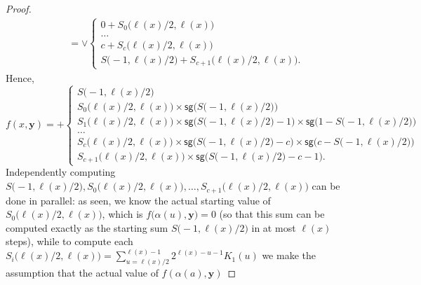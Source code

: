 \documentclass[11pt, oneside]{article}
\newenvironment{toappendix}{}{}
\newcommand{\fun}[1]{\mathsf{#1}}
\newcommand{\tu}[1]{\mathbf{#1}}
\theoremstyle{definition}
\begin{document}
\begin{toappendix}
\begin{proof}
\begin{align*}
        &= \vee \begin{cases}
            0 + S_0\big(\ell(x)/2, \ell(x)\big) \\
            \dots \\
            c + S_c\big(\ell(x)/2, \ell(x)\big) \\
            S\big(-1, \ell(x)/2\big) + S_{c+1}\big(\ell(x)/2, \ell(x)\big).
        \end{cases}
    \end{align*}
    Hence,
    $$
    f(x, \tu y) = + \begin{cases}
        S\big(-1, \ell(x)/2\big) \\
        S_0\big(\ell(x)/2, \ell(x)\big) \times \fun{sg}\big(S\big(-1, \ell(x)/2\big)\big) \\
        S_1\big(\ell(x)/2, \ell(x)\big) \times \fun{sg}\big(S\big(-1, \ell(x)/2\big)-1\big) \times \fun{sg}\big(1-S\big(-1, \ell(x)/2\big)\big) \\
        \dots \\
        S_c \big(\ell(x)/2, \ell(x)\big) \times \fun{sg}\big(S\big(-1, \ell(x)/2\big)-c\big) \times \fun{sg}\big(c-S\big(-1, \ell(x)/2\big)\big) \\
        S_{c+1} \big(\ell(x)/2, \ell(x)\big) \times \fun{sg}\big(S\big(-1, \ell(x)/2\big)-c-1\big).
    \end{cases}
    $$
    Independently computing $S\big(-1, \ell(x)/2\big), S_0\big(\ell(x)/2, \ell(x)\big), \dots, S_{c+1}\big(\ell(x)/2, \ell(x)\big)$ can be done in parallel: as seen, we know the actual starting value of $S_0\big(\ell(x)/2, \ell(x)\big)$, which is $f\big(\alpha(u), \tu y\big)=0$ (so that this sum can be computed exactly as the starting sum $S\big(-1, \ell(x)/2\big)$ in at most $\ell(x)$ steps),
    while to compute each $S_i\big(\ell(x)/2, \ell(x)\big)=\sum^{\ell(x)-1}_{u=\ell(x)/2} 2^{\ell(x)-u-1} K_1(u)$ we make the assumption that the actual value of $f(\alpha(a), \tu y)$
\end{proof}

\end{toappendix}
\end{document}
